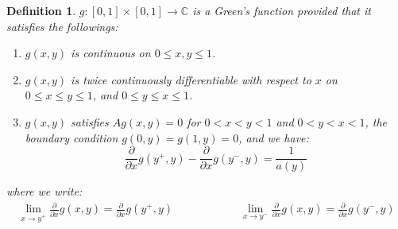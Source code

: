 \documentclass[11pt]{book}
\theoremstyle{break}
\theoremstyle{break}
\newtheorem{defn}{Definition}[corL]
\newcommand{\C}{\mathbb{C}}
\newcommand{\pd}{\partial}
\begin{document}
\begin{defn}
$g:[0,1]\times [0,1] \to \C$ is a Green's function provided that it satisfies the followings:
\begin{enumerate}[topsep=3pt,itemsep=-1ex,partopsep=1ex,parsep=1ex]
\item $g(x,y)$ is continuous on $0\leq x,y \leq 1$. 
\item $g(x,y)$ is twice continuously differentiable with respect to $x$ on $0\leq x\leq y \leq 1 $, and $0\leq y \leq x \leq 1$. 
\item $g(x,y)$ satisfies $Ag(x,y) = 0$ for $0<x<y<1$ and $0<y<x<1$, the boundary condition $g(0,y) = g(1,y) = 0$, and we have:
$$\frac{\pd}{\pd x}g(y^+, y) - \frac{\pd}{\pd x}g(y^-,y) = \frac{1}{a(y)}$$
\end{enumerate}
where we write:
\begin{align*}
\lim_{x \to y^+} \frac{\pd}{\pd x}g(x,y) = \frac{\pd}{\pd x}g(y^+,y)
\qquad\qquad\qquad
\lim_{x \to y^-} \frac{\pd}{\pd x}g(x,y) = \frac{\pd}{\pd x}g(y^-,y)
\end{align*}
\end{defn}
\end{document}
